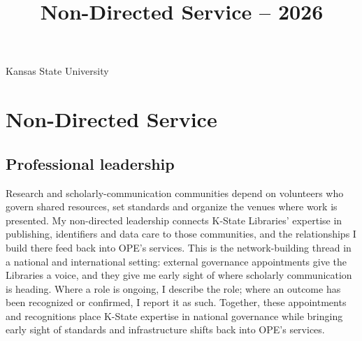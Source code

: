 \title{Non-Directed Service -- 2026}
\address{University Library}{Kansas State University}
\portfoliotitle

\begingroup
\setlength{\parindent}{1.5em}
\setlength{\parskip}{0.45em}

\section{Non-Directed Service}

\subsection{Professional leadership}
Research and scholarly-communication communities depend on volunteers who govern shared resources, set standards and organize the venues where work is presented. My non-directed leadership connects K-State Libraries' expertise in publishing, identifiers and data care to those communities, and the relationships I build there feed back into OPE's services. This is the network-building thread in a national and international setting: external governance appointments give the Libraries a voice, and they give me early sight of where scholarly communication is heading. Where a role is ongoing, I describe the role; where an outcome has been recognized or confirmed, I report it as such. Together, these appointments and recognitions place K-State expertise in national governance while bringing early sight of standards and infrastructure shifts back into OPE's services.

